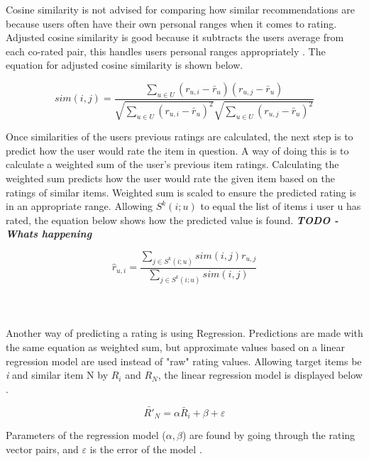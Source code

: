 Cosine similarity is not advised for comparing how similar recommendations are because users often have their own personal ranges when it comes to rating. Adjusted cosine similarity is good because it subtracts the users average from each co-rated pair, this handles users personal ranges appropriately \citep{sarwar_item-based_2001}. The equation for adjusted cosine similarity is shown below.

\begin{equation}
	sim(i , j) = \frac{ \sum_{ u \in U } ( r _{ u, i } - \bar{r} _{u} ) ( r _{ u, j} - \bar{r} _{u} ) } { \sqrt{\sum_{ u \in U } ( r _{ u, i } - \bar{r} _{u} )^2} \sqrt{\sum_{ u \in U } ( r _{ u, j } - \bar{r} _{u} )^2}}
\end{equation}

Once similarities of the users previous ratings are calculated, the next step is to predict how the user would rate the item in question. A way of doing this is to calculate a weighted sum of the user's previous item ratings. Calculating the weighted sum predicts how the user would rate the given item based on the ratings of similar items. Weighted sum is scaled to ensure the predicted rating is in an appropriate range\citep{sarwar_item-based_2001}. Allowing $ S^{k}(i;u)$ to equal the list of items i user u has rated, the equation below shows how the predicted value is found. \textbf{\textit{TODO - Whats happening}}

\begin{equation}
	\hat{r} _{u,i} = \frac{ \sum _{ j \in S^{k}(i;u)} sim(i , j) r _{u, j}}{\sum _{j \in S^{k}(i;u)} sim(i , j)}
\end{equation}
\\
\\
\\
Another way of predicting a rating is using Regression. Predictions are made with the same equation as weighted sum, but approximate values based on a linear regression model are used instead of "raw" rating values. Allowing target items be \textit{i} and similar item N by $R_{i}$ and $R_{N}$, the linear regression model is displayed below \citep{sarwar_item-based_2001}.

\begin{equation}
	\bar{R'} _{N} = \alpha \bar{R}_{i} + \beta + \varepsilon
\end{equation}

Parameters of the regression model ($\alpha , \beta$) are found by going through the rating vector pairs, and $\varepsilon$ is the error of the model \citep{sarwar_item-based_2001}.

